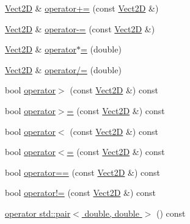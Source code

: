 \begin{DoxyCompactItemize}
\item 
\hyperlink{classVect2D}{Vect2D} \& \hyperlink{classVect2D_ac4a0c9f90498d4745557bfd67da88f2d_ac4a0c9f90498d4745557bfd67da88f2d}{operator+=} (const \hyperlink{classVect2D}{Vect2D} \&)
\item 
\hyperlink{classVect2D}{Vect2D} \& \hyperlink{classVect2D_a8513ee56819d5becc5d486acf16f78ed_a8513ee56819d5becc5d486acf16f78ed}{operator-\/=} (const \hyperlink{classVect2D}{Vect2D} \&)
\item 
\hyperlink{classVect2D}{Vect2D} \& \hyperlink{classVect2D_ac5988c6f0333458d3eac708e4d96e378_ac5988c6f0333458d3eac708e4d96e378}{operator$\ast$=} (double)
\item 
\hyperlink{classVect2D}{Vect2D} \& \hyperlink{classVect2D_a3b7548e38f4b0dc4df235cc71b20492b_a3b7548e38f4b0dc4df235cc71b20492b}{operator/=} (double)
\item 
bool \hyperlink{classVect2D_a22aecc87e1f93ef47761421b138c0f21_a22aecc87e1f93ef47761421b138c0f21}{operator$>$} (const \hyperlink{classVect2D}{Vect2D} \&) const
\item 
bool \hyperlink{classVect2D_a244c5937db2e35a99eeed4d3af2e9663_a244c5937db2e35a99eeed4d3af2e9663}{operator$>$=} (const \hyperlink{classVect2D}{Vect2D} \&) const
\item 
bool \hyperlink{classVect2D_acf1966ca9b29afb6ddf7900b6d471e28_acf1966ca9b29afb6ddf7900b6d471e28}{operator$<$} (const \hyperlink{classVect2D}{Vect2D} \&) const
\item 
bool \hyperlink{classVect2D_ae2d571e20a3332e68e8289e7683c8dc7_ae2d571e20a3332e68e8289e7683c8dc7}{operator$<$=} (const \hyperlink{classVect2D}{Vect2D} \&) const
\item 
bool \hyperlink{classVect2D_a90c23632f377ade5b4f59b226bc6d934_a90c23632f377ade5b4f59b226bc6d934}{operator==} (const \hyperlink{classVect2D}{Vect2D} \&) const
\item 
bool \hyperlink{classVect2D_a94963287794e76b9a511fb5f766d9082_a94963287794e76b9a511fb5f766d9082}{operator!=} (const \hyperlink{classVect2D}{Vect2D} \&) const
\item 
\hyperlink{classVect2D_adc9809c2f646699cc2a1b43936b5caf3_adc9809c2f646699cc2a1b43936b5caf3}{operator std\+::pair$<$ double, double $>$} () const
\end{DoxyCompactItemize}

